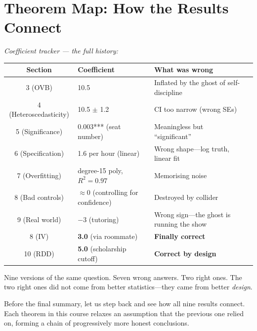 \documentclass[11pt,a4paper]{article}
\theoremstyle{definition}
\theoremstyle{plain}
\theoremstyle{remark}
\begin{document}
\section{Theorem Map: How the Results Connect}\label{sec:theoremmap}

\noindent\textit{Coefficient tracker --- the full history:}
\begin{center}
\small
\begin{tabular}{@{}clll@{}}
\toprule
\textbf{Section} & \textbf{Coefficient} & \textbf{What was wrong} \\
\midrule
3 (OVB) & 10.5 & Inflated by the ghost of self-discipline \\
4 (Heteroscedasticity) & 10.5 $\pm$ 1.2 & CI too narrow (wrong SEs) \\
5 (Significance) & 0.003*** (seat number) & Meaningless but ``significant'' \\
6 (Specification) & 1.6 per hour (linear) & Wrong shape---log truth, linear fit \\
7 (Overfitting) & degree-15 poly, $R^2 = 0.97$ & Memorising noise \\
8 (Bad controls) & $\approx 0$ (controlling for confidence) & Destroyed by collider \\
9 (Real world) & $-3$ (tutoring) & Wrong sign---the ghost is running the show \\
8 (IV) & \textbf{3.0} (via roommate) & \textbf{Finally correct} \\
10 (RDD) & \textbf{5.0} (scholarship cutoff) & \textbf{Correct by design} \\
\bottomrule
\end{tabular}
\end{center}

\noindent Nine versions of the same question. Seven wrong answers. Two right ones. The two right ones did not come from better statistics---they came from better \emph{design}.

\medskip
Before the final summary, let us step back and see how all nine results connect. Each theorem in this course relaxes an assumption that the previous one relied on, forming a chain of progressively more honest conclusions.
\end{document}
